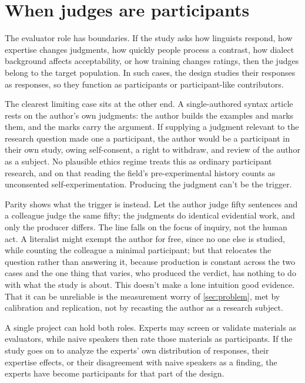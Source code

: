 \section{When judges are participants}
\label{sec:boundary-cases}

The evaluator role has boundaries. If the study asks how linguists respond, how expertise changes judgments, how quickly people process a contrast, how dialect background affects acceptability, or how training changes ratings, then the judges belong to the target population. In such cases, the design studies their responses as responses, so they function as participants or participant-like contributors.

The clearest limiting case sits at the other end. A single-authored syntax article rests on the author's own judgments: the author builds the examples and marks them, and the marks carry the argument. If supplying a judgment relevant to the research question made one a participant, the author would be a participant in their own study, owing self-consent, a right to withdraw, and review of the author as a subject. No plausible ethics regime treats this as ordinary participant research, and on that reading the field's pre-experimental history counts as unconsented self-experimentation. Producing the judgment can't be the trigger.

Parity shows what the trigger is instead. Let the author judge fifty sentences and a colleague judge the same fifty; the judgments do identical evidential work, and only the producer differs. The line falls on the focus of inquiry, not the human act. A literalist might exempt the author for free, since no one else is studied, while counting the colleague a minimal participant; but that relocates the question rather than answering it, because production is constant across the two cases and the one thing that varies, who produced the verdict, has nothing to do with what the study is about. This doesn't make a lone intuition good evidence. That it can be unreliable is the measurement worry of \autoref{sec:problem}, met by calibration and replication, not by recasting the author as a research subject.

A single project can hold both roles. Experts may screen or validate materials as evaluators, while naive speakers then rate those materials as participants. If the study goes on to analyze the experts' own distribution of responses, their expertise effects, or their disagreement with naive speakers as a finding, the experts have become participants for that part of the design.


